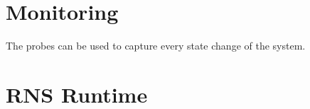 \section{Monitoring}

The probes can be used to capture every state change of the system.






\section{RNS Runtime}
\label{sec:rns-runtime}








